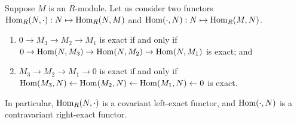 \begin{theorem}\label{thm:hom-functor-exact}
    Suppose \(M\) is an \(R\)-module.
    Let us consider two functors
    \(\operatorname{Hom}_R(N,\cdot): N \mapsto \operatorname{Hom}_R(N,M)\) and \(\operatorname{Hom}(\cdot,N): N \mapsto \operatorname{Hom}_R(M,N)\).
    \begin{enumerate}[label={(\alph*)}, itemsep=0mm]
        \item \(0 \to M_3 \to M_2 \to M_1\) is exact
            if and only if \(0 \to \operatorname{Hom}(N,M_3) \to \operatorname{Hom}(N,M_2) \to \operatorname{Hom}(N,M_1)\) is exact; and
        \item \(M_3 \to M_2 \to M_1 \to 0\) is exact
            if and only if \(\operatorname{Hom}(M_3,N) \gets \operatorname{Hom}(M_2,N) \gets \operatorname{Hom}(M_1,N) \gets 0\) is exact.
    \end{enumerate}
    In particular, \(\operatorname{Hom}_R(N,\cdot)\) is a covariant left-exact functor,
    and \(\operatorname{Hom}(\cdot,N)\) is a contravariant right-exact functor.
\end{theorem}
